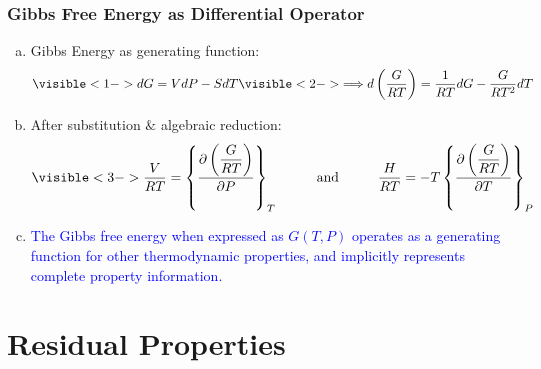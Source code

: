 \documentclass[10pt,compress,handout,ignorenonframetext,unknownkeysallowed]{beamer}
\newcommand{\frc}{\displaystyle\frac}
\begin{document}
\begin{frame}
  \frametitle{Gibbs Free Energy as Differential Operator}
     \begin{enumerate}[(a)]
        \item<1-> Gibbs Energy as generating function:
              \begin{displaymath}
                 \visible<1->{dG = VdP - SdT} \visible<2->{\Longrightarrow d\left(\frc{G}{RT}\right) = \frc{1}{RT}dG - \frc{G}{RT^{2}}dT} \nonumber 
              \end{displaymath}

        \item<3-> After substitution $\&$ algebraic reduction:
              \begin{displaymath}
                  \visible<3->{\frc{V}{RT} = \left\{ \frc{\partial\left(\frc{G}{RT}\right)}{\partial P}\right\}_{T} \hspace{1cm}\text{and}\hspace{1cm} \frc{H}{RT} = -T\left\{ \frc{\partial\left(\frc{G}{RT}\right)}{\partial T}\right\}_{P}}
              \end{displaymath}

        \item<4-> \textcolor{blue}{The Gibbs free energy when expressed as $G\left(T,P\right)$ operates as a generating function for other thermodynamic properties, and implicitly represents complete property information.}
     \end{enumerate}

\end{frame}
\normalsize

\section{Residual Properties}
\end{document}
